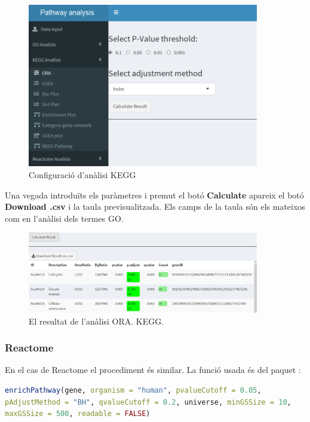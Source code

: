 \documentclass[]{article}
\begin{document}
\begin{figure}[H]
\centering
\includegraphics[width=0.9\textwidth]{App_F7_Items_KEGG_ORA.png} 
\caption{Configuració d'anàlisi KEGG}
\end{figure}



Una vegada introduïts els paràmetres i premut el botó \textbf{Calculate} apareix el botó \textbf{Download .csv} i la taula previsualitzada. Els camps de la taula són els mateixos com en l'anàlisi dels termes GO.
\begin{figure}[H]
\centering
\includegraphics[width=0.9\textwidth]{App_F9_Items_KEGG_ORA_Table.png} 
\caption{El resultat de l'anàlisi ORA. KEGG.}
\end{figure}

\subsubsection{Reactome}
En el cas de Reactome el procediment és similar. La funció usada és  del paquet :

\begin{lstlisting}[language=R]
enrichPathway(gene, organism = "human", pvalueCutoff = 0.05,
pAdjustMethod = "BH", qvalueCutoff = 0.2, universe, minGSSize = 10,
maxGSSize = 500, readable = FALSE)
\end{lstlisting}
\end{document}
